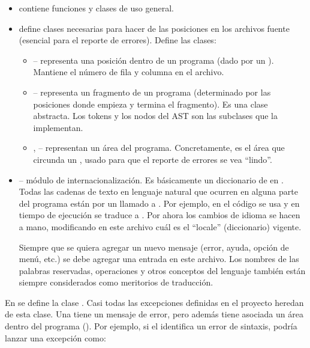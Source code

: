 \documentclass{article}
\begin{document}
\begin{itemize}
\item {} contiene funciones y clases de uso general.

\item {} define clases necesarias para
hacer  de las posiciones en los archivos
fuente (esencial para el reporte de errores). Define las clases:

\begin{itemize}
\item {} --
representa una posici\'on dentro de un programa
(dado por un ).
Mantiene el n\'umero de fila y columna en el archivo.
\item {} --
representa un fragmento de un programa (determinado por las posiciones
donde empieza y termina el fragmento).
Es una clase abstracta. Los tokens y los nodos del AST son las
subclases que la implementan.
\item {},  --
representan un \'area del programa.
Concretamente, 
es el \'area que circunda un ,
usado para que el reporte de errores se vea ``lindo''.
\end{itemize}

\item {} -- m\'odulo de internacionalizaci\'on.
Es b\'asicamente un diccionario de  en .
Todas las cadenas de texto en lenguaje natural que ocurren
en alguna parte del programa est\'an  por un
llamado a . Por ejemplo,
en el c\'odigo se usa 
y en tiempo de ejecuci\'on se traduce a .
Por ahora los cambios de idioma se hacen a mano,
modificando en este archivo cu\'al es el ``locale'' (diccionario)
vigente.

Siempre que se quiera agregar un nuevo mensaje (error,
ayuda, opci\'on de men\'u, etc.) se debe agregar una entrada en
este archivo. Los nombres de las palabras reservadas,
operaciones  y otros conceptos del lenguaje
tambi\'en est\'an siempre considerados como meritorios de
traducci\'on.
\end{itemize}

En  se define la
clase .
Casi todas las excepciones definidas en el proyecto heredan
de esta clase. Una  tiene un mensaje de error,
pero adem\'as tiene asociada un \'area dentro del programa
(). Por ejemplo, si el
 identifica un error de sintaxis, podr\'ia lanzar una
excepci\'on como:
\end{document}
